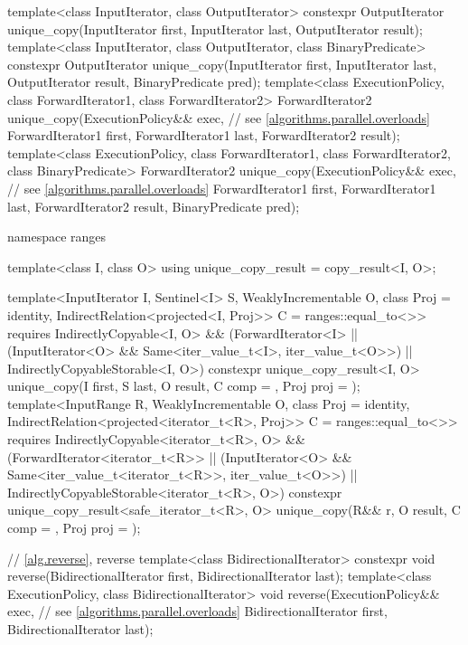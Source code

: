 \begin{codeblock}
{  template<class InputIterator, class OutputIterator>
    constexpr OutputIterator
      unique_copy(InputIterator first, InputIterator last,
                  OutputIterator result);
  template<class InputIterator, class OutputIterator, class BinaryPredicate>
    constexpr OutputIterator
      unique_copy(InputIterator first, InputIterator last,
                  OutputIterator result, BinaryPredicate pred);
  template<class ExecutionPolicy, class ForwardIterator1, class ForwardIterator2>
    ForwardIterator2
      unique_copy(ExecutionPolicy&& exec, // see \ref{algorithms.parallel.overloads}
                  ForwardIterator1 first, ForwardIterator1 last,
                  ForwardIterator2 result);
  template<class ExecutionPolicy, class ForwardIterator1, class ForwardIterator2,
           class BinaryPredicate>
    ForwardIterator2
      unique_copy(ExecutionPolicy&& exec, // see \ref{algorithms.parallel.overloads}
                  ForwardIterator1 first, ForwardIterator1 last,
                  ForwardIterator2 result, BinaryPredicate pred);

  namespace ranges {
    template<class I, class O>
    using unique_copy_result = copy_result<I, O>;

    template<InputIterator I, Sentinel<I> S, WeaklyIncrementable O,
             class Proj = identity, IndirectRelation<projected<I, Proj>> C = ranges::equal_to<>>
      requires IndirectlyCopyable<I, O> &&
               (ForwardIterator<I> ||
                (InputIterator<O> && Same<iter_value_t<I>, iter_value_t<O>>) ||
                IndirectlyCopyableStorable<I, O>)
      constexpr unique_copy_result<I, O>
        unique_copy(I first, S last, O result, C comp = {}, Proj proj = {});
    template<InputRange R, WeaklyIncrementable O, class Proj = identity,
             IndirectRelation<projected<iterator_t<R>, Proj>> C = ranges::equal_to<>>
      requires IndirectlyCopyable<iterator_t<R>, O> &&
               (ForwardIterator<iterator_t<R>> ||
                (InputIterator<O> && Same<iter_value_t<iterator_t<R>>, iter_value_t<O>>) ||
                IndirectlyCopyableStorable<iterator_t<R>, O>)
      constexpr unique_copy_result<safe_iterator_t<R>, O>
        unique_copy(R&& r, O result, C comp = {}, Proj proj = {});
  }

  // \ref{alg.reverse}, reverse
  template<class BidirectionalIterator>
    constexpr void reverse(BidirectionalIterator first, BidirectionalIterator last);
  template<class ExecutionPolicy, class BidirectionalIterator>
    void reverse(ExecutionPolicy&& exec, // see \ref{algorithms.parallel.overloads}
                 BidirectionalIterator first, BidirectionalIterator last);

}
\end{codeblock}
